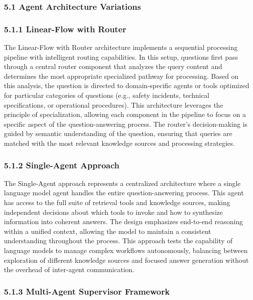             \subsubsection{5.1 Agent Architecture Variations}

            \subsubsection{5.1.1 Linear-Flow with Router}

            The Linear-Flow with Router architecture implements a sequential processing pipeline with intelligent routing capabilities. In this setup, questions first pass through a central router component that analyzes the query content and determines the most appropriate specialized pathway for processing. Based on this analysis, the question is directed to domain-specific agents or tools optimized for particular categories of questions (e.g., safety incidents, technical specifications, or operational procedures). This architecture leverages the principle of specialization, allowing each component in the pipeline to focus on a specific aspect of the question-answering process. The router's decision-making is guided by semantic understanding of the question, ensuring that queries are matched with the most relevant knowledge sources and processing strategies.

            \subsubsection{5.1.2 Single-Agent Approach}

            The Single-Agent approach represents a centralized architecture where a single language model agent handles the entire question-answering process. This agent has access to the full suite of retrieval tools and knowledge sources, making independent decisions about which tools to invoke and how to synthesize information into coherent answers. The design emphasizes end-to-end reasoning within a unified context, allowing the model to maintain a consistent understanding throughout the process. This approach tests the capability of language models to manage complex workflows autonomously, balancing between exploration of different knowledge sources and focused answer generation without the overhead of inter-agent communication.

            \subsubsection{5.1.3 Multi-Agent Supervisor Framework}

